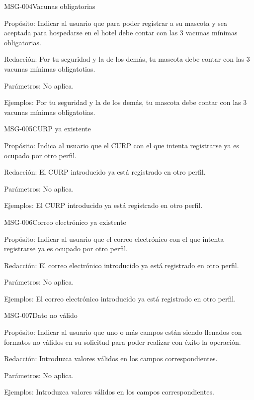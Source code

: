 \begin{cdtMessage}[msgErrorColor]{MSG-004}{Vacunas obligatorias}
	\item[Propósito:] Indicar al usuario que para poder registrar a su mascota y sea aceptada para hospedarse en el hotel debe contar con las 3 vacunas mínimas obligatorias.
	\item[Redacción:] Por tu seguridad y la de los demás, tu mascota debe contar con las 3 vacunas mínimas obligatotias.
	\item[Parámetros:] No aplica.
	\item[Ejemplos:] Por tu seguridad y la de los demás, tu mascota debe contar con las 3 vacunas mínimas obligatotias.
\end{cdtMessage}

\begin{cdtMessage}[msgErrorColor]{MSG-005}{CURP ya existente}
	\item[Propósito:] Indica al usuario que el CURP con el que intenta registrarse ya es ocupado por otro perfil.
	\item[Redacción:] El CURP introducido ya está registrado en otro perfil.
	\item[Parámetros:] No aplica.
	\item[Ejemplos:] El CURP introducido ya está registrado en otro perfil.
\end{cdtMessage}

\begin{cdtMessage}[msgErrorColor]{MSG-006}{Correo electrónico ya existente}
	\item[Propósito:] Indicar al usuario que el correo electrónico con el que intenta registrarse ya es ocupado por otro perfil.
	\item[Redacción:] El correo electrónico introducido ya está registrado en otro perfil.
	\item[Parámetros:] No aplica.
	\item[Ejemplos:] El correo electrónico introducido ya está registrado en otro perfil.
\end{cdtMessage}

\begin{cdtMessage}[msgErrorColor]{MSG-007}{Dato no válido}
	\item[Propósito:] Indicar al usuario que uno o más campos están siendo llenados con formatos no válidos en su solicitud para poder realizar con éxito la operación.
	\item[Redacción:] Introduzca valores válidos en los campos correspondientes.
	\item[Parámetros:] No aplica.
	\item[Ejemplos:] Introduzca valores válidos en los campos correspondientes.
\end{cdtMessage}

